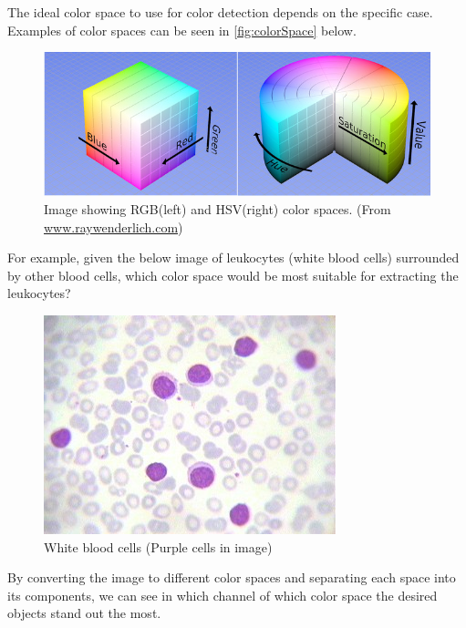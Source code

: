 			The ideal color space to use for color detection depends on the specific case. Examples of color spaces can be seen in \autoref{fig:colorSpace} below.
			\begin{figure}[H]
				\centering
				\includegraphics[width=0.9\linewidth]{figure/Analysis/colorspaces.jpg}
				\caption{Image showing RGB(left) and HSV(right) color spaces. (From \href{https://www.raywenderlich.com/69855/image-processing-in-ios-part-1-raw-bitmap-modification}{www.raywenderlich.com})}
				\label{fig:colorSpace}
			\end{figure}
			For example, given the below image of leukocytes (white blood cells) surrounded by other blood cells, which color space would be most suitable for extracting the leukocytes?
			\begin{figure}[H]
				\centering
				\includegraphics[width=0.2\linewidth]{figure/Analysis/leukocytes.jpg}
				\caption{White blood cells (Purple cells in image)}
				\label{fig:leukocytes}
			\end{figure}
			
			By converting the image to different color spaces and separating each space into its components, we can see in which channel of which color space the desired objects stand out the most. 
			
